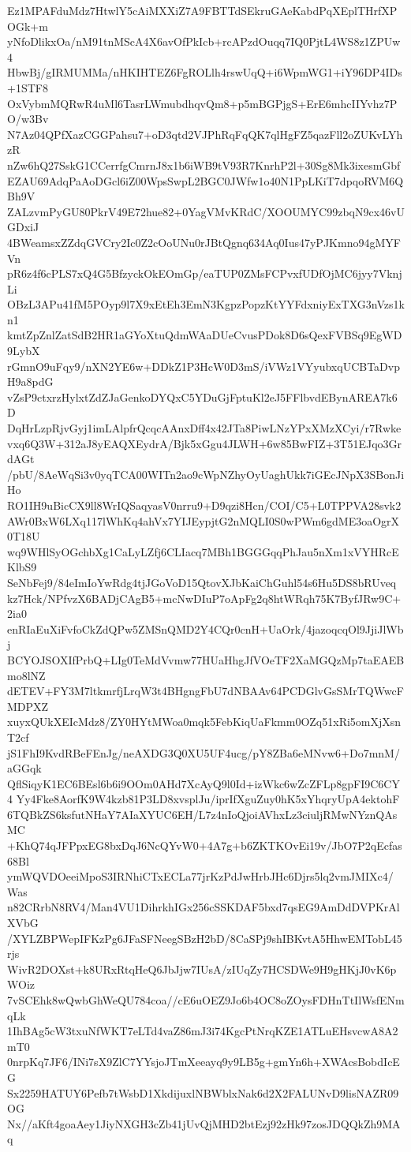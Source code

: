 Ez1MPAFduMdz7HtwlY5cAiMXXiZ7A9FBTTdSEkruGAeKabdPqXEplTHrfXPOGk+m
yNfoDlikxOa/nM91tnMScA4X6avOfPkIcb+rcAPzdOuqq7IQ0PjtL4WS8z1ZPUw4
HbwBj/gIRMUMMa/nHKIHTEZ6FgROLlh4rswUqQ+i6WpmWG1+iY96DP4IDs+1STF8
OxVybmMQRwR4uMl6TasrLWmubdhqvQm8+p5mBGPjgS+ErE6mhcIIYvhz7PO/w3Bv
N7Az04QPfXazCGGPahsu7+oD3qtd2VJPhRqFqQK7qlHgFZ5qazFll2oZUKvLYhzR
nZw6hQ27SskG1CCerrfgCmrnJ8x1b6iWB9tV93R7KnrhP2l+30Sg8Mk3ixesmGbf
EZAU69AdqPaAoDGcl6iZ00WpsSwpL2BGC0JWfw1o40N1PpLKiT7dpqoRVM6QBh9V
ZALzvmPyGU80PkrV49E72hue82+0YagVMvKRdC/XOOUMYC99zbqN9cx46vUGDxiJ
4BWeamsxZZdqGVCry2Ic0Z2cOoUNu0rJBtQgnq634Aq0Ius47yPJKmno94gMYFVn
pR6z4f6cPLS7xQ4G5BfzyckOkEOmGp/eaTUP0ZMsFCPvxfUDfOjMC6jyy7VknjLi
OBzL3APu41fM5POyp9l7X9xEtEh3EmN3KgpzPopzKtYYFdxniyExTXG3nVzs1kn1
kmtZpZnlZatSdB2HR1aGYoXtuQdmWAaDUeCvusPDok8D6sQexFVBSq9EgWD9LybX
rGmnO9uFqy9/nXN2YE6w+DDkZ1P3HcW0D3mS/iVWz1VYyubxqUCBTaDvpH9a8pdG
vZsP9ctxrzHylxtZdZJaGenkoDYQxC5YDuGjFptuKl2eJ5FFlbvdEBynAREA7k6D
DqHrLzpRjvGyj1imLAlpfrQcqcAAnxDff4x42JTa8PiwLNzYPxXMzXCyi/r7Rwke
vxq6Q3W+312aJ8yEAQXEydrA/Bjk5xGgu4JLWH+6w85BwFIZ+3T51EJqo3GrdAGt
/pbU/8AeWqSi3v0yqTCA00WITn2ao9cWpNZhyOyUaghUkk7iGEcJNpX3SBonJiHo
RO1IH9uBicCX9ll8WrIQSaqyasV0nrru9+D9qzi8Hcn/COI/C5+L0TPPVA28svk2
AWr0BxW6LXq117lWhKq4ahVx7YIJEypjtG2nMQLI0S0wPWm6gdME3oaOgrX0T18U
wq9WHlSyOGchbXg1CaLyLZfj6CLIacq7MBh1BGGGqqPhJau5nXm1xVYHRcEKlbS9
SeNbFej9/84eImIoYwRdg4tjJGoVoD15QtovXJbKaiChGuhl54s6Hu5DS8bRUveq
kz7Hck/NPfvzX6BADjCAgB5+mcNwDIuP7oApFg2q8htWRqh75K7ByfJRw9C+2ia0
enRIaEuXiFvfoCkZdQPw5ZMSnQMD2Y4CQr0cnH+UaOrk/4jazoqcqOl9JjiJlWbj
BCYOJSOXIfPrbQ+LIg0TeMdVvmw77HUaHhgJfVOeTF2XaMGQzMp7taEAEBmo8lNZ
dETEV+FY3M7ltkmrfjLrqW3t4BHgngFbU7dNBAAv64PCDGlvGsSMrTQWwcFMDPXZ
xuyxQUkXEIcMdz8/ZY0HYtMWoa0mqk5FebKiqUaFkmm0OZq51xRi5omXjXsnT2cf
jS1FhI9KvdRBeFEnJg/neAXDG3Q0XU5UF4ucg/pY8ZBa6eMNvw6+Do7mnM/aGGqk
QflSiqyK1EC6BEsl6b6i9OOm0AHd7XcAyQ9l0Id+izWkc6wZcZFLp8gpFI9C6CY4
Yy4Fke8AorfK9W4kzb81P3LD8xvsplJu/iprIfXguZuy0hK5xYhqryUpA4ektohF
6TQBkZS6ksfutNHaY7AIaXYUC6EH/L7z4nIoQjoiAVhxLz3ciuljRMwNYznQAsMC
+KhQ74qJFPpxEG8bxDqJ6NcQYvW0+4A7g+b6ZKTKOvEi19v/JbO7P2qEcfas68Bl
ymWQVDOeeiMpoS3IRNhiCTxECLa77jrKzPdJwHrbJHc6Djrs5lq2vmJMIXc4/Was
n82CRrbN8RV4/Man4VU1DihrkhIGx256cSSKDAF5bxd7qsEG9AmDdDVPKrAlXVbG
/XYLZBPWepIFKzPg6JFaSFNeegSBzH2bD/8CaSPj9shIBKvtA5HhwEMTobL45rjs
WivR2DOXst+k8URxRtqHeQ6JbJjw7IUsA/zIUqZy7HCSDWe9H9gHKjJ0vK6pWOiz
7vSCEhk8wQwbGhWeQU784coa//cE6uOEZ9Jo6b4OC8oZOysFDHnTtIlWsfENmqLk
1IhBAg5cW3txuNfWKT7eLTd4vaZ86mJ3i74KgcPtNrqKZE1ATLuEHsvcwA8A2mT0
0nrpKq7JF6/INi7sX9ZlC7YYsjoJTmXeeayq9y9LB5g+gmYn6h+XWAcsBobdIcEG
Sx2259HATUY6Pefb7tWsbD1XkdijuxlNBWblxNak6d2X2FALUNvD9lisNAZR09OG
Nx//aKft4goaAey1JiyNXGH3cZb41jUvQjMHD2btEzj92zHk97zosJDQQkZh9MAq
